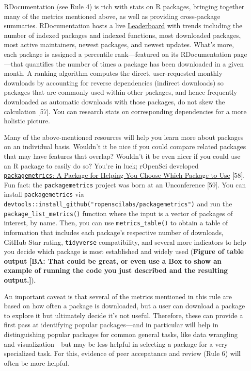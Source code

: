 \documentclass[10pt,letterpaper]{article}
\begin{document}
RDocumentation (see Rule 4) is rich with stats on R packages, bringing
together many of the metrics mentioned above, as well as providing
cross-package summaries. RDocumentation hosts a live
\href{https://www.rdocumentation.org/trends}{Leaderboard} with trends
including the number of indexed packages and indexed functions, most
downloaded packages, most active maintainers, newest packages, and
newest updates. What's more, each package is assigned a percentile
rank---featured on its RDocumentation page---that quantifies the number
of times a package has been downloaded in a given month. A ranking
algorithm computes the direct, user-requested monthly downloads by
accounting for reverse dependencies (indirect downloads) so packages
that are commonly used within other packages, and hence frequently
downloaded as automatic downloads with those packages, do not skew the
calculation {[}57{]}. You can research stats on corresponding
dependencies for a more holistic picture.

Many of the above-mentioned resources will help you learn more about
packages on an individual basis. Wouldn't it be nice if you could
compare related packages that may have features that overlap? Wouldn't
it be even nicer if you could use an R package to easily do so? You're
in luck; rOpenSci developed
\href{https://docs.ropensci.org/packagemetrics/}{\texttt{packagemetrics}:
A Package for Helping You Choose Which Package to Use} {[}58{]}. Fun
fact: the \texttt{packagemetrics} project was born at an Unconference
{[}59{]}. You can install \texttt{packagemetrics} via
\texttt{devtools::install\_github("ropenscilabs/packagemetrics")} and
run the \texttt{package\_list\_metrics()} function where the input is a
vector of packages of interest, by name. Then, you can use
\texttt{metrics\_table()} to obtain a table of information that includes
each package's respective number of downloads, GitHub Star rating,
\texttt{tidyverse} compatibility, and several more indicators to help
you decide which package is most established and widely used
(\textbf{Figure of table output {[}BA: That could be great, or even use
a Box to show an example of running the code you just described and the
resulting output.{]}}).

An important caveat is that several of the metrics mentioned in this
rule are based on how often a package is downloaded, but a user can
download a package to explore it but ultimately decide it's not useful.
Therefore, these can provide a first pass at identifying popular
packages---and in particular will help in distinguishing popular
packages for common general tasks, like data wrangling and
visualization---but may be less helpful in selecting a package for a
very specialized task. For this, evidence of peer accepatance and review
(Rule 6) will often be more helpful.
\end{document}
